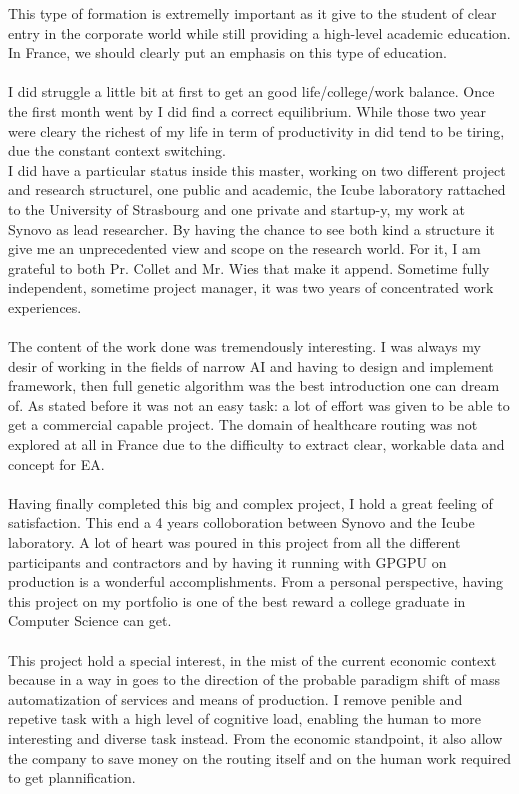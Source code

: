 \documentclass[12pt]{memoir}
\begin{document}
This type of formation is extremelly important as it give to the student of clear entry in the corporate world while 
still providing a high-level academic education. In France, we should clearly put an emphasis on this type of education.\\
\\
I did struggle a little bit at first to get an good life/college/work balance. Once the first month went by I did find 
a correct equilibrium. While those two year were cleary the richest of my life in term of productivity in did tend to 
be tiring, due the constant context switching.\\
I did have a particular status inside this master, working on two different project and research structurel, 
one public and academic, the Icube laboratory rattached to the University of Strasbourg and one private and
startup-y, my work at Synovo as lead researcher. By having the chance to see both kind a structure it give me an 
unprecedented view and scope on the research world. For it, I am grateful to both Pr. Collet and Mr. Wies that make it append.
Sometime fully independent, sometime project manager, it was two years of concentrated work experiences.\\
\\
The content of the work done was tremendously interesting. I was always my desir of working in the fields of narrow AI and 
having to design and implement framework, then full genetic algorithm was the best introduction one can dream of. As stated before 
it was not an easy task: a lot of effort was given to be able to get a commercial capable project. The domain of healthcare routing 
was not explored at all in France due to the difficulty to extract clear, workable data and concept for EA.\\
\\
Having finally completed this big and complex project, I hold a great feeling of satisfaction. 
This end a 4 years colloboration between Synovo and the Icube laboratory. A lot of heart was poured in this project from
 all the different participants and contractors and by having it running with GPGPU on production is a wonderful accomplishments.
 From a personal perspective, having this project on my portfolio is one of the best reward a college graduate in Computer Science can get.\\
\\
This project hold a special interest, in the mist of the current economic context because in a way in goes to the direction 
of the probable paradigm shift of mass automatization of services and means of production. I remove penible and repetive task
 with a high level of cognitive load, enabling the human to more interesting and diverse task instead. From the economic standpoint, it also allow the company to save money on the routing itself and on the human work required to get plannification. \\
\\



\end{document}
